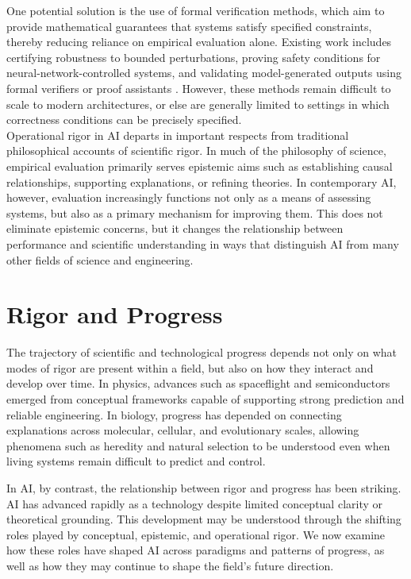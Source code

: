 \documentclass{article}
\begin{document}
One potential solution is the use of formal verification methods, which aim to provide mathematical guarantees that systems satisfy specified constraints, thereby reducing reliance on empirical evaluation alone.
Existing work includes certifying robustness to bounded perturbations, proving safety conditions for neural-network-controlled systems, and validating model-generated outputs using formal verifiers or proof assistants \cite{albarghouthi2021introduction, xiang2018verification, ivanov2019verisig, Hubert2025AlphaProof}.
However, these methods remain difficult to scale to modern architectures, or else are generally limited to settings in which correctness conditions can be precisely specified.\\

Operational rigor in AI departs in important respects from traditional philosophical accounts of scientific rigor.
In much of the philosophy of science, empirical evaluation primarily serves epistemic aims such as establishing causal relationships, supporting explanations, or refining theories.
In contemporary AI, however, evaluation increasingly functions not only as a means of assessing systems, but also as a primary mechanism for improving them.
This does not eliminate epistemic concerns, but it changes the relationship between performance and scientific understanding in ways that distinguish AI from many other fields of science and engineering.


\section{Rigor and Progress}
\label{sec:Progress}

The trajectory of scientific and technological progress depends not only on what modes of rigor are present within a field, but also on how they interact and develop over time.
In physics, advances such as spaceflight and semiconductors emerged from conceptual frameworks capable of supporting strong prediction and reliable engineering.
In biology, progress has depended on connecting explanations across molecular, cellular, and evolutionary scales, allowing phenomena such as heredity and natural selection to be understood even when living systems remain difficult to predict and control.

In AI, by contrast, the relationship between rigor and progress has been striking.
AI has advanced rapidly as a technology despite limited conceptual clarity or theoretical grounding.
This development may be understood through the shifting roles played by conceptual, epistemic, and operational rigor.
We now examine how these roles have shaped AI across paradigms and patterns of progress, as well as how they may continue to shape the field’s future direction.
\end{document}
